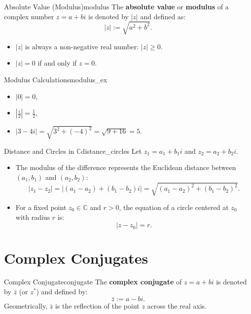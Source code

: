 \begin{definition}{Absolute Value (Modulus)}{modulus}
The \textbf{absolute value} or \textbf{modulus} of a complex number $z = a + bi$ is denoted by $|z|$ and defined as:
\begin{equation}
|z| := \sqrt{a^2 + b^2}.
\end{equation}
\begin{itemize}
    \item $|z|$ is always a non-negative real number: $|z| \ge 0$.
    \item $|z| = 0$ if and only if $z = 0$.
\end{itemize}
\end{definition}

\begin{example}{Modulus Calculations}{modulus_ex}
\begin{itemize}
    \item $|0| = 0$,
    \item $\left|\frac{i}{2}\right| = \frac{1}{2}$,
    \item $|3 - 4i| = \sqrt{3^2 + (-4)^2} = \sqrt{9 + 16} = 5$.
\end{itemize}
\end{example}

\begin{proposition}{Distance and Circles in $\mathbb{C}$}{distance_circles}
Let $z_1 = a_1 + b_1 i$ and $z_2 = a_2 + b_2 i$.
\begin{itemize}
    \item The modulus of the difference represents the Euclidean distance between $(a_1, b_1)$ and $(a_2, b_2)$:
    \begin{equation}
    |z_1 - z_2| = |(a_1 - a_2) + (b_1 - b_2)i| = \sqrt{(a_1 - a_2)^2 + (b_1 - b_2)^2}.
    \end{equation}
    \item For a fixed point $z_0 \in \mathbb{C}$ and $r > 0$, the equation of a circle centered at $z_0$ with radius $r$ is:
    \begin{equation}
    |z - z_0| = r.
    \end{equation}
\end{itemize}
\end{proposition}


\section{Complex Conjugates}

\begin{definition}{Complex Conjugate}{conjugate}
The \textbf{complex conjugate} of $z = a + bi$ is denoted by $\bar{z}$ (or $z^*$) and defined by:
\begin{equation}
\bar{z} := a - bi.
\end{equation}
Geometrically, $\bar{z}$ is the reflection of the point $z$ across the real axis.
\end{definition}

